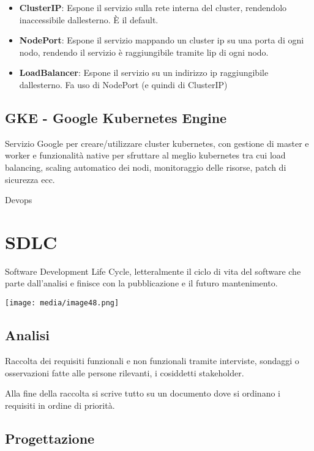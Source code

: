 \begin{itemize}
\item
  \textbf{ClusterIP}: Espone il servizio sulla rete interna del cluster,
  rendendolo inaccessibile dall\textquotesingle esterno. È il default.
\item
  \textbf{NodePort}: Espone il servizio mappando un cluster ip su una
  porta di ogni nodo, rendendo il servizio è raggiungibile tramite
  l\textquotesingle ip di ogni nodo.
\item
  \textbf{LoadBalancer}: Espone il servizio su un indirizzo ip
  raggiungibile dall\textquotesingle esterno. Fa uso di NodePort (e
  quindi di ClusterIP)
\end{itemize}

\subsection{GKE - Google Kubernetes
Engine}\label{gke---google-kubernetes-engine}

Servizio Google per creare/utilizzare cluster kubernetes, con gestione
di master e worker e funzionalità native per sfruttare al meglio
kubernetes tra cui load balancing, scaling automatico dei nodi,
monitoraggio delle risorse, patch di sicurezza ecc.

Devops

\section{SDLC}\label{sdlc}

Software Development Life Cycle, letteralmente il ciclo di vita del
software che parte dall'analisi e finisce con la pubblicazione e il
futuro mantenimento.

\texttt{[image: media/image48.png]}

\subsection{Analisi}\label{analisi}

Raccolta dei requisiti funzionali e non funzionali tramite interviste,
sondaggi o osservazioni fatte alle persone rilevanti, i cosiddetti
stakeholder.

Alla fine della raccolta si scrive tutto su un documento dove si
ordinano i requisiti in ordine di priorità.

\subsection{Progettazione}\label{progettazione}

